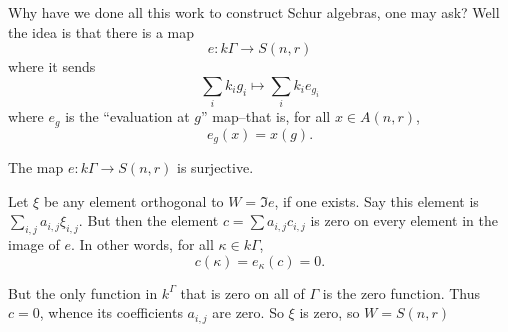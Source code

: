 \documentclass[12pt]{article}
\begin{document}
Why have we done all this work to construct Schur algebras, one may ask? Well the idea is that there is a map
\[e:k\Gamma\to S(n,r)\]
where it sends 
\[\sum_i k_i g_i\mapsto \sum_i k_i e_{g_i}\]
where $e_g$ is the ``evaluation at $g$'' map--that is, for all $x\in A(n,r)$,
\[e_g(x)=x(g).\]
\begin{lem}\label{lem:e-surj}
	The map $e:k\Gamma\to S(n,r)$ is surjective.
\end{lem}
\begin{prf}
	Let $\xi$ be any element orthogonal to $W=\Im e$, if one exists. Say this element is $\sum_{i,j}a_{i,j}\xi_{i,j}$.
	But then the element $c=\sum a_{i,j}c_{i,j}$ is zero on every element in the image of $e$. In other words, for all $\kappa\in k\Gamma$,
	\[c(\kappa)=e_\kappa(c)=0.\]
	
	But the only function in $k^\Gamma$ that is zero on all of $\Gamma$ is the zero function. Thus $c=0$, whence its coefficients $a_{i,j}$ are zero. So $\xi$ is zero, so $W=S(n,r)$
\end{prf}
\end{document}

